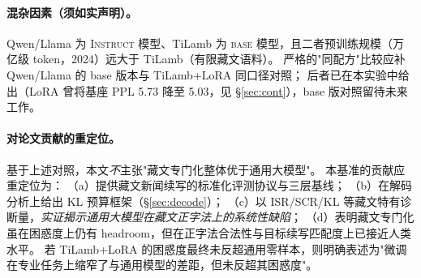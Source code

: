 \paragraph{混杂因素（须如实声明）。}
Qwen/Llama 为 \textsc{Instruct} 模型、TiLamb 为 \textsc{base} 模型，且二者预训练规模（万亿级 token，2024）远大于 TiLamb（有限藏文语料）。
严格的"同配方"比较应补 Qwen/Llama 的 base 版本与 TiLamb+LoRA 同口径对照；
后者已在本实验中给出（LoRA 曾将基座 PPL 5.73 降至 5.03，见 \S\ref{sec:cont}），base 版对照留待未来工作。

\paragraph{对论文贡献的重定位。}
基于上述对照，本文\emph{不}主张"藏文专门化整体优于通用大模型"。
本基准的贡献应重定位为：
（a）提供藏文新闻续写的标准化评测协议与三层基线；
（b）在解码分析上给出 KL 预算框架（\S\ref{sec:decode}）；
（c）以 ISR/SCR/KL 等藏文特有诊断量，\emph{实证揭示通用大模型在藏文正字法上的系统性缺陷}；
（d）表明藏文专门化虽在困惑度上仍有 headroom，但在正字法合法性与目标续写匹配度上已接近人类水平。
若 TiLamb+LoRA 的困惑度最终未反超通用零样本，则明确表述为"微调在专业任务上缩窄了与通用模型的差距，但未反超其困惑度"。
